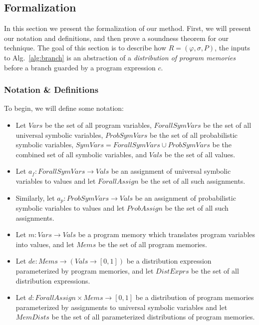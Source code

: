 \documentclass[acmsmall,review]{acmart}\settopmatter{}
\begin{document}
	
	\subsection{Formalization}
	\label{sec:formalization}
	
	In this section we present the formalization of our method. First, we will present our notation and definitions, and then prove a soundness theorem for our technique.
	The goal of this section is to describe how $R=(\varphi,\sigma,P)$, the inputs to Alg.~\ref{alg:branch} is an abstraction of a \textit{distribution of program memories} before a branch guarded by a program expression $c$.
	
	\subsubsection{Notation \& Definitions}
	\label{sec:notation}
	
	To begin, we will define some notation:
	\begin{itemize}
		\item Let $Vars$ be the set of all program variables, $ForallSymVars$ be the set of all universal symbolic variables, $ProbSymVars$ be the set of all probabilistic symbolic variables, $SymVars = ForallSymVars \cup ProbSymVars$ be the combined set of all symbolic variables, and $Vals$ be the set of all values. 
		\item Let $a_f: ForallSymVars \rightarrow Vals$ be an assignment of universal symbolic variables to values and let $ForallAssign$ be the set of all such assignments.
		\item Similarly, let $a_p : ProbSymVars \rightarrow Vals$ be an assignment of probabilistic symbolic variables to values and let $ProbAssign$ be the set of all such assignments.
		\item Let $m : Vars \rightarrow Vals$ be a program memory which translates program variables into values, and let $Mems$ be the set of all program memories.
		\item Let $de : Mems \rightarrow (Vals \rightarrow [0,1])$ be a distribution expression parameterized by program memories, and let $DistExprs$ be the set of all distribution expressions.
		\item Let $d : ForallAssign \times Mems \rightarrow [0,1]$ be a distribution of program memories parameterized by assignments to universal symbolic variables and let $MemDists$ be the set of all parameterized distributions of program memories.
	\end{itemize}
	
\end{document}
